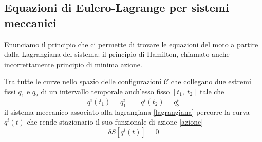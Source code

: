 \subsection{Equazioni di Eulero-Lagrange per sistemi meccanici}

    Enunciamo il principio che ci permette di trovare le equazioni del moto a partire dalla Lagrangiana del sistema: il principio di Hamilton, chiamato anche incorrettamente principio di minima azione.

    \begin{principle}[di Hamilton]
        Tra tutte le curve nello spazio delle configurazioni $\mathcal C$ che collegano due estremi fissi $q_1$ e $q_2$ di un intervallo temporale anch'esso fisso $[t_1, ~t_2]$ tale che 
    \begin{equation*}
        q^i(t_1) = q^i_1 \qquad q^i(t_2) = q^i_2
    \end{equation*}
        il sistema meccanico associato alla lagrangiana \eqref{lagrangiana} percorre la curva $q^i(t)$ che rende stazionario il suo funzionale di azione \eqref{azione}
    \begin{equation} \label{azionestazionaria}
        \delta S [q^i(t)] = 0
    \end{equation}
    \end{principle}

